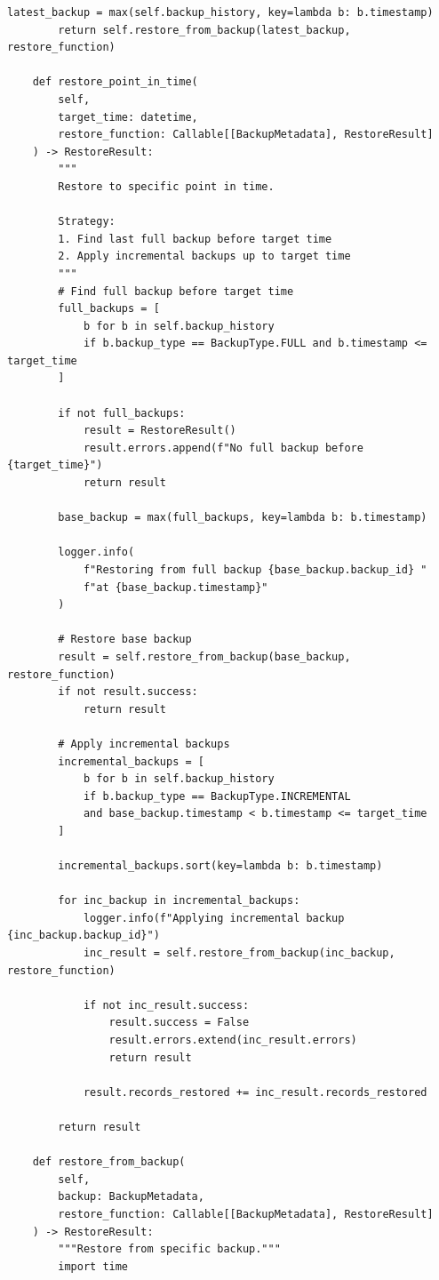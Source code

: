 \begin{lstlisting}[style=python, caption={Restore Manager with Validation}]
        latest_backup = max(self.backup_history, key=lambda b: b.timestamp)
        return self.restore_from_backup(latest_backup, restore_function)

    def restore_point_in_time(
        self,
        target_time: datetime,
        restore_function: Callable[[BackupMetadata], RestoreResult]
    ) -> RestoreResult:
        """
        Restore to specific point in time.

        Strategy:
        1. Find last full backup before target time
        2. Apply incremental backups up to target time
        """
        # Find full backup before target time
        full_backups = [
            b for b in self.backup_history
            if b.backup_type == BackupType.FULL and b.timestamp <= target_time
        ]

        if not full_backups:
            result = RestoreResult()
            result.errors.append(f"No full backup before {target_time}")
            return result

        base_backup = max(full_backups, key=lambda b: b.timestamp)

        logger.info(
            f"Restoring from full backup {base_backup.backup_id} "
            f"at {base_backup.timestamp}"
        )

        # Restore base backup
        result = self.restore_from_backup(base_backup, restore_function)
        if not result.success:
            return result

        # Apply incremental backups
        incremental_backups = [
            b for b in self.backup_history
            if b.backup_type == BackupType.INCREMENTAL
            and base_backup.timestamp < b.timestamp <= target_time
        ]

        incremental_backups.sort(key=lambda b: b.timestamp)

        for inc_backup in incremental_backups:
            logger.info(f"Applying incremental backup {inc_backup.backup_id}")
            inc_result = self.restore_from_backup(inc_backup, restore_function)

            if not inc_result.success:
                result.success = False
                result.errors.extend(inc_result.errors)
                return result

            result.records_restored += inc_result.records_restored

        return result

    def restore_from_backup(
        self,
        backup: BackupMetadata,
        restore_function: Callable[[BackupMetadata], RestoreResult]
    ) -> RestoreResult:
        """Restore from specific backup."""
        import time


\end{lstlisting}
